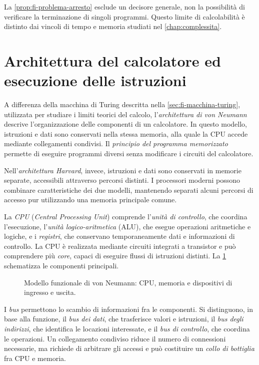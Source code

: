 La \cref{prop:fi-problema-arresto} esclude un decisore generale,
non la possibilità di verificare la terminazione di singoli programmi.
Questo limite di calcolabilità è distinto dai vincoli di tempo e
memoria studiati nel \cref{chap:complessita}.

\section{Architettura del calcolatore ed esecuzione delle istruzioni}
\label{sec:fi-architettura-calcolatore}

A differenza della macchina di Turing descritta nella
\cref{sec:fi-macchina-turing}, utilizzata per studiare i limiti
teorici del calcolo, l'\emph{architettura di von Neumann} descrive
l'organizzazione delle componenti di un calcolatore. In questo
modello, istruzioni e dati sono conservati nella stessa memoria,
alla quale la CPU accede mediante collegamenti condivisi.
Il \emph{principio del programma memorizzato} permette di eseguire
programmi diversi senza modificare i circuiti del calcolatore.

Nell'\emph{architettura Harvard}, invece, istruzioni e dati
sono conservati in memorie separate, accessibili attraverso
percorsi distinti. I processori moderni possono combinare
caratteristiche dei due modelli, mantenendo separati alcuni
percorsi di accesso pur utilizzando una memoria principale comune.

La \emph{CPU} (\emph{Central Processing Unit}) comprende l'\emph{unità
di controllo}, che coordina l'esecuzione, l'\emph{unità
logico-aritmetica} (ALU), che esegue operazioni aritmetiche e logiche,
e i \emph{registri}, che conservano temporaneamente dati e informazioni
di controllo. La CPU è realizzata mediante circuiti integrati a transistor
e può comprendere più \emph{core}, capaci di eseguire flussi di
istruzioni distinti. La \cref{fig:fi-von-neumann} schematizza
le componenti principali.

\begin{figure}[htbp]
  \centering
  
  \caption{Modello funzionale di von Neumann: CPU, memoria e
  dispositivi di ingresso e uscita.}
  \label{fig:fi-von-neumann}
\end{figure}

I \emph{bus} permettono lo scambio di informazioni fra le componenti.
Si distinguono, in base alla funzione, il \emph{bus dei dati}, che
trasferisce valori e istruzioni, il \emph{bus degli indirizzi}, che
identifica le locazioni interessate, e il \emph{bus di controllo},
che coordina le operazioni. Un collegamento condiviso riduce il numero
di connessioni necessarie, ma richiede di arbitrare gli accessi e può
costituire un \emph{collo di bottiglia} fra CPU e memoria.

